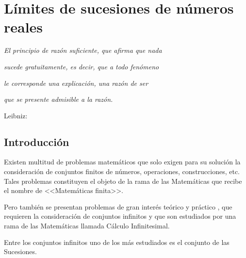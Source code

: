 
\chapter{\hspace*{-5pt}Límites de sucesiones de números reales}

\PartialToc

\hypersetup{linkcolor=ptctitle}

\vspace*{0.5cm}
 
\begin{flushright}
\textit{\footnotesize{}El principio de razón suficiente, que afirma
que nada}
\par\end{flushright}{\footnotesize \par}

\begin{flushright}
\textit{\footnotesize{}sucede gratuitamente, es decir, que a todo
fenómeno }
\par\end{flushright}{\footnotesize \par}

\begin{flushright}
\textit{\footnotesize{}le corresponde una explicación, una razón de
ser }
\par\end{flushright}{\footnotesize \par}

\begin{flushright}
\textit{\footnotesize{}que se presente admisible a la razón. }
\par\end{flushright}{\footnotesize \par}

\begin{flushright}
{\small{} }Leibniz: 
\par\end{flushright}

\vspace*{-1mm}


\section{Introducción }

Existen multitud de problemas matemáticos que solo exigen para su
solución la consideración de conjuntos finitos de números, operaciones,
construcciones, etc. Tales problemas constituyen el objeto de la rama
de las Matemáticas que recibe el nombre de <<\textsf{Matemáticas
finita}>>.

Pero también se presentan problemas de gran interés teórico y práctico
, que requieren la consideración de conjuntos infinitos y que son
estudiados por una rama de las Matemáticas llamada \textsf{Cálculo
Infinitesimal}.

Entre los conjuntos infinitos uno de los más estudiados es el conjunto
de las \textsf{Sucesiones}. 
